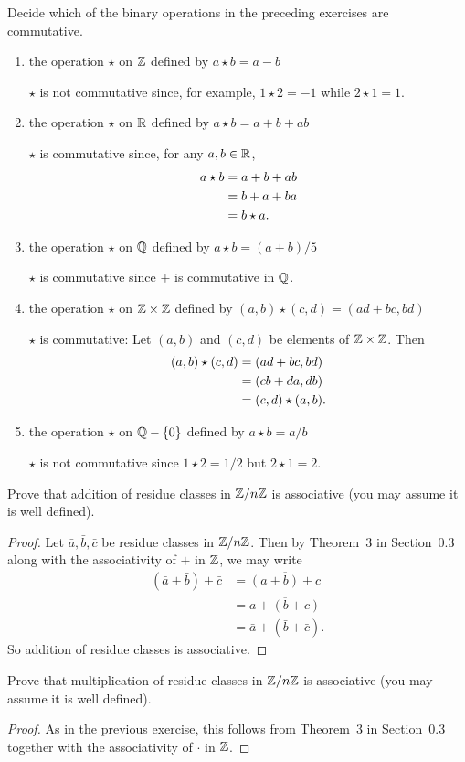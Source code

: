  Decide which of the binary operations in the preceding
exercises are commutative.
\begin{enumerate}
\item the operation $\star$ on $\mathbb{Z}$ defined by $a\star b = a - b$
  \begin{solution}
    $\star$ is not commutative since, for example, $1\star2 = -1$
    while $2\star1 = 1$.
  \end{solution}
\item the operation $\star$ on $\mathbb{R}$ defined by $a\star b = a + b + ab$
  \begin{solution}
    $\star$ is commutative since, for any $a,b\in\mathbb{R}$,
    \begin{align*}
      a\star b &= a + b + ab \\
               &= b + a + ba \\
               &= b\star a. \qedhere
    \end{align*}
  \end{solution}
\item the operation $\star$ on $\mathbb{Q}$ defined by $a\star b = (a + b)/5$
  \begin{solution}
    $\star$ is commutative since $+$ is commutative in $\mathbb{Q}$.
  \end{solution}
\item the operation $\star$ on $\mathbb{Z}\times\mathbb{Z}$ defined by
  $(a,b)\star(c,d) = (ad + bc, bd)$
  \begin{solution}
    $\star$ is commutative: Let $(a,b)$ and $(c,d)$ be elements of
    $\mathbb{Z}\times\mathbb{Z}$. Then
    \begin{align*}
      (a,b)\star(c,d) &= (ad + bc, bd) \\
                      &= (cb + da, db) \\
                      &= (c,d)\star(a,b). \qedhere
    \end{align*}
  \end{solution}
\item the operation $\star$ on $\mathbb{Q} - \{0\}$ defined by
  $a\star b = a/b$
  \begin{solution}
    $\star$ is not commutative since $1\star2 = 1/2$ but
    $2\star1 = 2$.
  \end{solution}
\end{enumerate}

 Prove that addition of residue classes in $\mathbb{Z}/n\mathbb{Z}$ is
associative (you may assume it is well defined).
\begin{proof}
  Let $\bar{a}, \bar{b}, \bar{c}$ be residue classes in $\mathbb{Z}/n\mathbb{Z}$. Then
  by Theorem~3 in Section~0.3 along with the associativity of $+$ in
  $\mathbb{Z}$, we may write
  \begin{align*}
    (\bar{a} + \bar{b}) + \bar{c}
    &= \overline{(a + b) + c} \\
    &= \overline{a + (b + c)} \\
    &= \bar{a} + (\bar{b} + \bar{c}).
  \end{align*}
  So addition of residue classes is associative.
\end{proof}

 Prove that multiplication of residue classes in $\mathbb{Z}/n\mathbb{Z}$ is
associative (you may assume it is well defined).
\begin{proof}
  As in the previous exercise, this follows from Theorem~3 in
  Section~0.3 together with the associativity of $\cdot$ in $\mathbb{Z}$.
\end{proof}
